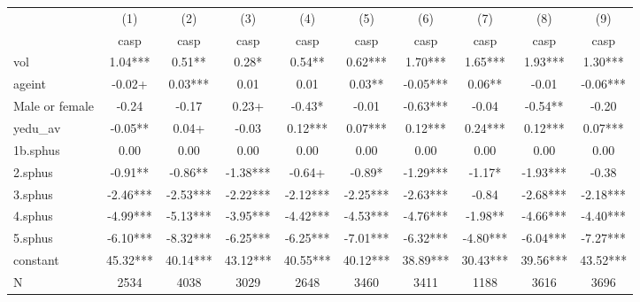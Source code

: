 {
\def\sym#1{\ifmmode^{#1}\else\(^{#1}\)\fi}
\begin{tabular}{l*{9}{c}}
\hline\hline
                    &\multicolumn{1}{c}{(1)}&\multicolumn{1}{c}{(2)}&\multicolumn{1}{c}{(3)}&\multicolumn{1}{c}{(4)}&\multicolumn{1}{c}{(5)}&\multicolumn{1}{c}{(6)}&\multicolumn{1}{c}{(7)}&\multicolumn{1}{c}{(8)}&\multicolumn{1}{c}{(9)}\\
                    &\multicolumn{1}{c}{casp}&\multicolumn{1}{c}{casp}&\multicolumn{1}{c}{casp}&\multicolumn{1}{c}{casp}&\multicolumn{1}{c}{casp}&\multicolumn{1}{c}{casp}&\multicolumn{1}{c}{casp}&\multicolumn{1}{c}{casp}&\multicolumn{1}{c}{casp}\\
\hline
vol                 &        1.04***&        0.51** &        0.28*  &        0.54** &        0.62***&        1.70***&        1.65***&        1.93***&        1.30***\\
ageint              &       -0.02+  &        0.03***&        0.01   &        0.01   &        0.03** &       -0.05***&        0.06** &       -0.01   &       -0.06***\\
Male or female      &       -0.24   &       -0.17   &        0.23+  &       -0.43*  &       -0.01   &       -0.63***&       -0.04   &       -0.54** &       -0.20   \\
yedu\_av             &       -0.05** &        0.04+  &       -0.03   &        0.12***&        0.07***&        0.12***&        0.24***&        0.12***&        0.07***\\
1b.sphus            &        0.00   &        0.00   &        0.00   &        0.00   &        0.00   &        0.00   &        0.00   &        0.00   &        0.00   \\
2.sphus             &       -0.91** &       -0.86** &       -1.38***&       -0.64+  &       -0.89*  &       -1.29***&       -1.17*  &       -1.93***&       -0.38   \\
3.sphus             &       -2.46***&       -2.53***&       -2.22***&       -2.12***&       -2.25***&       -2.63***&       -0.84   &       -2.68***&       -2.18***\\
4.sphus             &       -4.99***&       -5.13***&       -3.95***&       -4.42***&       -4.53***&       -4.76***&       -1.98** &       -4.66***&       -4.40***\\
5.sphus             &       -6.10***&       -8.32***&       -6.25***&       -6.25***&       -7.01***&       -6.32***&       -4.80***&       -6.04***&       -7.27***\\
constant            &       45.32***&       40.14***&       43.12***&       40.55***&       40.12***&       38.89***&       30.43***&       39.56***&       43.52***\\
\hline
N                   &        2534   &        4038   &        3029   &        2648   &        3460   &        3411   &        1188   &        3616   &        3696   \\
\hline\hline
\end{tabular}
}
